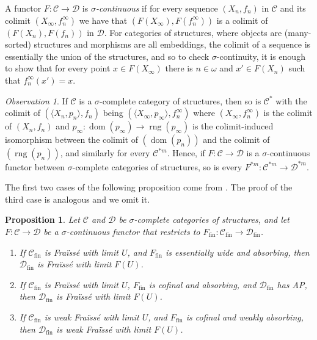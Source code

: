 \documentclass[oneside,notitlepage,12pt]{article}
\newtheorem{prop}[tw]{Proposition}
\theoremstyle{definition}
\theoremstyle{remark}
\newtheorem{observation}[tw]{Observation}
\newcommand \seq [1]{\langle #1 \rangle}
\newcommand \maps {\colon} %
\newcommand \dom {\operatorname{dom}}
\newcommand \rng {\operatorname{rng}}
\newcommand \sig {\sigma}
\newcommand \C {\mathscr{C}}
\newcommand \D {\mathscr{D}}
\newcommand \fin {{\operatorname{fin}}}
\begin{document}
A functor $F\maps \C \to \D$ is {\it $\sigma$-continuous} if  for every sequence $(X_n, f_n)$ in $\C$ and its colimit $(X_\infty, f^\infty_n)$ we have that $(F(X_\infty), F(f^\infty_n))$ is a colimit of $(F(X_n), F(f_n))$ in $\D$.
For categories of structures, where objects are (many-sorted) structures and morphisms are all embeddings, the colimit of a sequence is essentially the union of the structures, and so to check $\sig$-continuity, it is enough to show that for every point $x \in F(X_\infty)$ there is $n \in \omega$ and $x' \in F(X_n)$ such that $f_n^\infty(x') = x$.



\begin{observation}
    If $\C$ is a $\sigma$-complete category of structures, then so is $\C^*$ with the colimit of $(\seq{X_n, p_n}, f_n)$ being $(\seq{X_\infty, p_\infty}, f^\infty_n)$ where $(X_\infty, f^\infty_n)$ is the colimit of $(X_n, f_n)$ and $p_\infty\maps \dom(p_\infty) \to \rng(p_\infty)$ is the colimit-induced isomorphism between the colimit of $(\dom(p_n))$ and the colimit of $(\rng(p_n))$, and similarly for every $\C^{*m}$.
    Hence, if $F\maps \C \to \D$ is a $\sigma$-continuous functor between $\sigma$-complete categories of structures, so is every $F^{*m}\maps \C^{*m} \to \D^{*m}$.
\end{observation}

The first two cases of the following proposition come from \cite[Proposition~3.8]{paper1}. The proof of the third case is analogous and we omit it.


\begin{prop} \label{thm:Flim_transfer}
    Let $\C$ and $\D$ be $\sigma$-complete categories of structures, and let $F\maps \C \to \D$ be a $\sigma$-continuous functor that restricts to $F_\fin\maps \C_\fin \to \D_\fin$.
    \begin{enumerate}
        \item If $\C_\fin$ is Fraïssé with limit $U$, and $F_\fin$ is essentially wide and absorbing, then $\D_\fin$ is Fraïssé with limit $F(U)$.
        
        \item If $\C_\fin$ is Fraïssé with limit $U$, $F_\fin$ is cofinal and absorbing, and $\D_\fin$ has AP, then $\D_\fin$ is Fraïssé with limit $F(U)$.
        
        \item If $\C_\fin$ is weak Fraïssé with limit $U$, and $F_\fin$ is cofinal and weakly absorbing, then $\D_\fin$ is weak Fraïssé with limit $F(U)$.
    \end{enumerate}
\end{prop}
\end{document}
